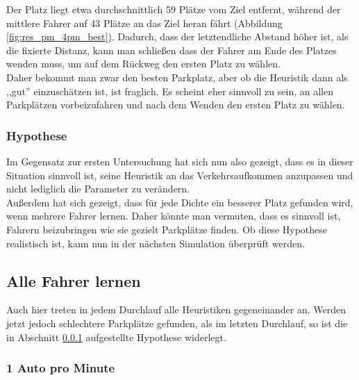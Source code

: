 Der Platz liegt etwa durchschnittlich 59 Plätze vom Ziel entfernt, während der mittlere Fahrer auf 43 Plätze an das Ziel heran fährt (Abbildung \ref{fig:res_pm_4pm_best}). Dadurch, dass der letztendliche Abstand höher ist, als die fixierte Distanz, kann man schließen dass der Fahrer am Ende des Platzes wenden muss, um auf dem Rückweg den ersten Platz zu wählen.\\
  Daher bekommt man zwar den besten Parkplatz, aber ob die Heuristik dann als ,,gut'' einzuschätzen ist, ist fraglich. Es scheint eher sinnvoll zu sein, an allen Parkplätzen vorbeizufahren und nach dem Wenden den ersten Platz zu wählen. \\
  
	\subsubsection{Hypothese}\label{sec:sim_hypo}  
  
  Im Gegensatz zur ersten Untersuchung hat sich nun also gezeigt, dass es in dieser Situation sinnvoll ist, seine Heuristik an das Verkehrsaufkommen anzupassen und nicht lediglich die Parameter zu verändern.\\
  Außerdem hat sich gezeigt, dass für jede Dichte ein besserer Platz gefunden wird, wenn mehrere Fahrer lernen. Daher könnte man vermuten, dass es sinnvoll ist, Fahrern beizubringen wie sie gezielt Parkplätze finden. Ob diese Hypothese realistisch ist, kann nun in der nächsten Simulation überprüft werden. 
  
  \subsection{Alle Fahrer lernen}
  
Auch hier treten in jedem Durchlauf alle Heuristiken gegeneinander an. Werden jetzt jedoch schlechtere Parkplätze gefunden, als im letzten Durchlauf, so ist die in Abschnitt \ref{sec:sim_hypo} aufgestellte Hypothese widerlegt.

  \subsubsection{1 Auto pro Minute}
  
